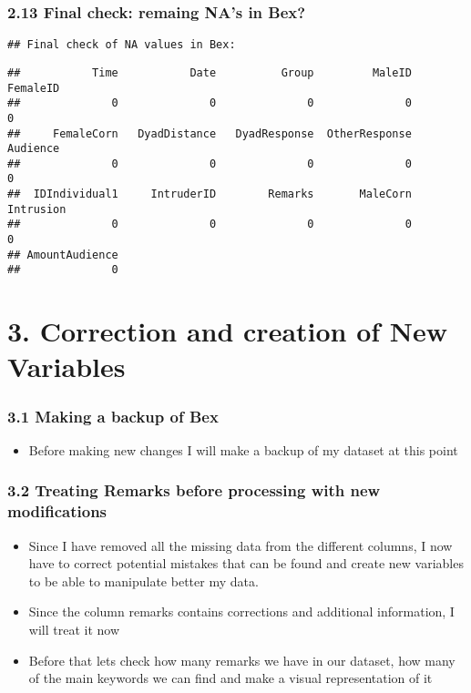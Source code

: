\documentclass[
]{article}
\providecommand{\tightlist}{%
  \setlength{\itemsep}{0pt}\setlength{\parskip}{0pt}}
\begin{document}
\hypertarget{final-check-remaing-nas-in-bex}{%
\subsubsection{2.13 Final check: remaing NA's in
Bex?}\label{final-check-remaing-nas-in-bex}}

\begin{verbatim}
## Final check of NA values in Bex:
\end{verbatim}

\begin{verbatim}
##           Time           Date          Group         MaleID       FemaleID 
##              0              0              0              0              0 
##     FemaleCorn   DyadDistance   DyadResponse  OtherResponse       Audience 
##              0              0              0              0              0 
##  IDIndividual1     IntruderID        Remarks       MaleCorn      Intrusion 
##              0              0              0              0              0 
## AmountAudience 
##              0
\end{verbatim}

\hypertarget{correction-and-creation-of-new-variables}{%
\section{3. Correction and creation of New
Variables}\label{correction-and-creation-of-new-variables}}

\hypertarget{making-a-backup-of-bex}{%
\subsubsection{3.1 Making a backup of
Bex}\label{making-a-backup-of-bex}}

\begin{itemize}
\tightlist
\item
  Before making new changes I will make a backup of my dataset at this
  point
\end{itemize}

\hypertarget{treating-remarks-before-processing-with-new-modifications}{%
\subsubsection{3.2 Treating Remarks before processing with new
modifications}\label{treating-remarks-before-processing-with-new-modifications}}

\begin{itemize}
\item
  Since I have removed all the missing data from the different columns,
  I now have to correct potential mistakes that can be found and create
  new variables to be able to manipulate better my data.
\item
  Since the column remarks contains corrections and additional
  information, I will treat it now
\item
  Before that lets check how many remarks we have in our dataset, how
  many of the main keywords we can find and make a visual representation
  of it
\end{itemize}
\end{document}
